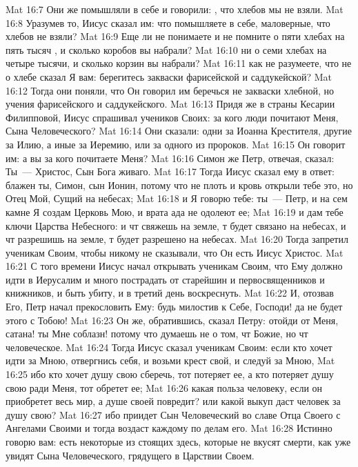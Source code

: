 \vs Mat 16:7 Они же помышляли в себе и говорили: , что хлебов мы не взяли.
\vs Mat 16:8 Уразумев то, Иисус сказал им: что помышляете в себе, маловерные, что хлебов не взяли?
\vs Mat 16:9 Еще ли не понимаете и не помните о пяти хлебах на пять тысяч , и сколько коробов вы набрали?
\vs Mat 16:10 ни о семи хлебах на четыре тысячи, и сколько корзин вы набрали?
\vs Mat 16:11 как не разумеете, что не о хлебе сказал Я вам: берегитесь закваски фарисейской и саддукейской?
\vs Mat 16:12 Тогда они поняли, что Он говорил им беречься не закваски хлебной, но учения фарисейского и саддукейского.
\rsbpar\vs Mat 16:13 Придя же в страны Кесарии Филипповой, Иисус спрашивал учеников Своих: за кого люди почитают Меня, Сына Человеческого?
\vs Mat 16:14 Они сказали: одни за Иоанна Крестителя, другие за Илию, а иные за Иеремию, или за одного из пророков.
\vs Mat 16:15 Он говорит им: а вы за кого почитаете Меня?
\vs Mat 16:16 Симон же Петр, отвечая, сказал: Ты~--- Христос, Сын Бога живаго.
\vs Mat 16:17 Тогда Иисус сказал ему в ответ: блажен ты, Симон, сын Ионин, потому что не плоть и кровь открыли тебе это, но Отец Мой, Сущий на небесах;
\vs Mat 16:18 и Я говорю тебе: ты~--- Петр, и на сем камне Я создам Церковь Мою, и врата ада не одолеют ее;
\vs Mat 16:19 и дам тебе ключи Царства Небесного: и чт свяжешь на земле, т будет связано на небесах, и чт разрешишь на земле, т будет разрешено на небесах.
\vs Mat 16:20 Тогда  запретил ученикам Своим, чтобы никому не сказывали, что Он есть Иисус Христос.
\rsbpar\vs Mat 16:21 С того времени Иисус начал открывать ученикам Своим, что Ему должно идти в Иерусалим и много пострадать от старейшин и первосвященников и книжников, и быть убиту, и в третий день воскреснуть.
\vs Mat 16:22 И, отозвав Его, Петр начал прекословить Ему: будь милостив к Себе, Господи! да не будет этого с Тобою!
\vs Mat 16:23 Он же, обратившись, сказал Петру: отойди от Меня, сатана! ты Мне соблазн! потому что думаешь не о том, чт Божие, но чт человеческое.
\vs Mat 16:24 Тогда Иисус сказал ученикам Своим: если кто хочет идти за Мною, отвергнись себя, и возьми крест свой, и следуй за Мною,
\vs Mat 16:25 ибо кто хочет душу свою сберечь, тот потеряет ее, а кто потеряет душу свою ради Меня, тот обретет ее;
\vs Mat 16:26 какая польза человеку, если он приобретет весь мир, а душе своей повредит? или какой выкуп даст человек за душу свою?
\vs Mat 16:27 ибо приидет Сын Человеческий во славе Отца Своего с Ангелами Своими и тогда воздаст каждому по делам его.
\vs Mat 16:28 Истинно говорю вам: есть некоторые из стоящих здесь, которые не вкусят смерти, как уже увидят Сына Человеческого, грядущего в Царствии Своем.
